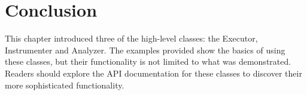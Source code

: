 \section{Conclusion}
This chapter introduced three of the high-level classes: the Executor, Instrumenter and Analyzer.  The examples provided show the basics of using these classes, but their functionality is not limited to what was demonstrated.  Readers should explore the API documentation for these classes to discover their more sophisticated functionality.